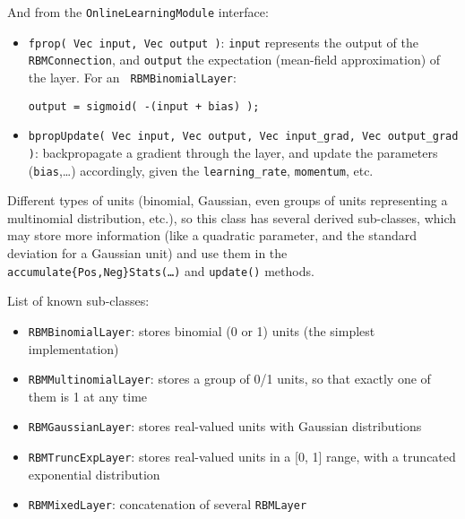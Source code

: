 \documentclass[11pt]{book}
\begin{document}
And from the {\tt OnlineLearningModule} interface:
\begin{itemize}

    \item {\tt fprop( Vec input, Vec output )}: {\tt input} represents
    the output of the {\tt RBMConnection}, and {\tt output} the
    expectation (mean-field approximation) of the layer. For an {\tt
    RBMBinomialLayer}:

\begin{verbatim}
output = sigmoid( -(input + bias) );
\end{verbatim}

    \item {\tt bpropUpdate( Vec input, Vec output, Vec input\_grad, Vec
    output\_grad )}: backpropagate a gradient through the layer, and
    update the parameters ({\tt bias},\ldots) accordingly, given the
    {\tt learning\_rate}, {\tt momentum}, etc.

\end{itemize}

Different types of units (binomial, Gaussian, even groups of units
representing a multinomial distribution, etc.), so this class has
several derived sub-classes, which may store more information (like a
quadratic parameter, and the standard deviation for a Gaussian unit) and
use them in the {\tt accumulate\{Pos,Neg\}Stats(\ldots)} and {\tt update()}
methods.

List of known sub-classes:
\begin{itemize}

    \item {\tt RBMBinomialLayer}: stores binomial (0 or 1) units (the
    simplest implementation)

    \item {\tt RBMMultinomialLayer}: stores a group of 0/1 units, so
    that exactly one of them is 1 at any time

    \item {\tt RBMGaussianLayer}: stores real-valued units with Gaussian
    distributions

    \item {\tt RBMTruncExpLayer}: stores real-valued units in a [0, 1]
    range, with a truncated exponential distribution

    \item {\tt RBMMixedLayer}: concatenation of several {\tt RBMLayer}

\end{itemize}
\end{document}
